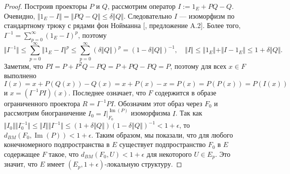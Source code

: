 \begin{proof}
Построив проекторы $P$ и $Q$, рассмотрим оператор $I:=1_E+PQ-Q$. Очевидно,
$\Vert 1_E-I\Vert=\Vert PQ-Q\Vert\leq \delta\Vert Q\Vert$. Следовательно $I$ ---
изоморфизм по стандартному трюку с рядами фон Нойманна
[\cite{KalAlbTopicsBanSpTh}, предложение A.2]. Более того,
$I^{-1}=\sum_{p=0}^\infty{(1_E-I)}^p$, поэтому
$$
\Vert I^{-1}\Vert
\leq\sum_{p=0}^\infty {\Vert 1_E-I\Vert}^p
\leq\sum_{p=0}^\infty{(\delta\Vert Q\Vert)}^p
={(1-\delta\Vert Q\Vert)}^{-1},
\quad
\Vert I\Vert\leq\Vert 1_E\Vert+\Vert I-1_E\Vert\leq 1+\delta\Vert Q\Vert.
$$
Заметим, что $PI=P+P^2Q-PQ=P+PQ-PQ=P$, поэтому для всех $x\in F$ выполнено 
$$
I(x)=x+P(Q(x))-Q(x)=x+P(x)-x=P(x)=P(P(x))=P(I(x))
$$
и $x=(I^{-1}PI)(x)$. Последнее означает, что $F$ содержится в образе
ограниченного проектора $R=I^{-1}PI$. Обозначим этот образ через $F_0$ и
рассмотрим биограничение  $I_0=I|_{F_0}^{\operatorname{Im}(P)}$ изоморфизма $I$.
Так как 
$\Vert I_0\Vert\Vert I_0^{-1}\Vert
\leq\Vert I\Vert
\Vert I^{-1}\Vert
\leq(1+\delta\Vert Q\Vert){(1-\delta\Vert Q\Vert)}^{-1}
<1+\epsilon$, то $d_{BM}(F_0,\operatorname{Im}(P))<1+\epsilon$. 
Таким образом, мы показали, что для любого конечномерного подпространства в 
$E$ существует подпространство $F_0$ в $E$ содержащее $F$ такое, что 
$d_{BM}(F_0,U)<1+\epsilon$ для некоторого $U\in E_{p}$. Это значит, что 
$E$ имеет $(E_{p}, 1+\epsilon)$-локальную структуру.
\end{proof}

